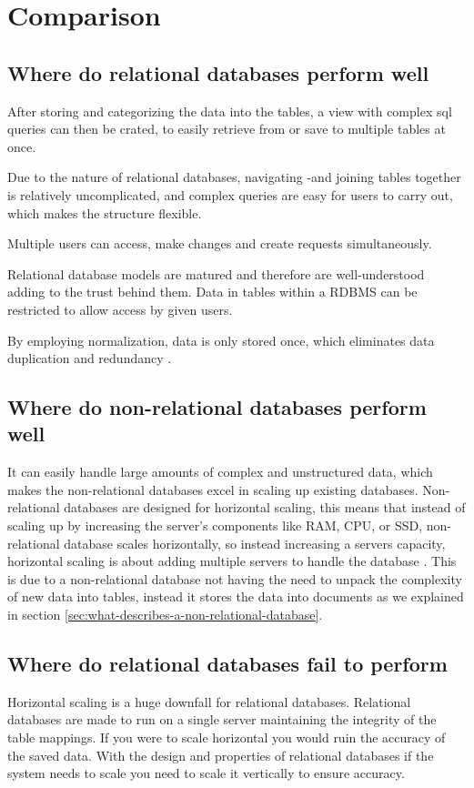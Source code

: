 \section{Comparison}

\subsection{Where do relational databases perform well}
After storing and categorizing the data into the tables, a view with complex sql queries can then be crated, to easily retrieve from or save to multiple tables at once.

Due to the nature of relational databases, navigating -and joining tables together is relatively uncomplicated, and complex queries are easy for users to carry out, which makes the structure flexible.

Multiple users can access, make changes and create requests simultaneously.

Relational database models are matured and therefore are well-understood adding to the trust behind them. Data in tables within a RDBMS can be restricted to allow access by given users.

By employing normalization, data is only stored once, which eliminates data duplication and redundancy \parencite{microsoft-normaliziation}.

\subsection{Where do non-relational databases perform well}
It can easily handle large amounts of complex and unstructured data, which makes the non-relational databases excel in scaling up existing databases.
Non-relational databases are designed for horizontal scaling, this means that instead of scaling up by increasing the server's components like RAM, CPU, or SSD, non-relational database scales horizontally, so instead increasing a servers capacity, horizontal scaling is about adding multiple servers to handle the database \parencite{mongodb-advantages-of-nosql}.
This is due to a non-relational database not having the need to unpack the complexity of new data into tables, instead it stores the data into documents as we explained in section \ref{sec:what-describes-a-non-relational-database}.


\subsection{Where do relational databases fail to perform}
Horizontal scaling is a huge downfall for relational databases. Relational databases are made to run on a single server maintaining the integrity of the table mappings. If you were to scale horizontal you would ruin the accuracy of the saved data.
With the design and properties of relational databases if the system needs to scale you need to scale it vertically to ensure accuracy. \parencite{loginradius-rdbms-vs-nosql}

